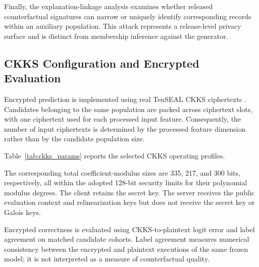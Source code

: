 \documentclass[preprint,12pt]{elsarticle}
\begin{document}
Finally, the explanation-linkage analysis examines whether released
counterfactual signatures can narrow or uniquely identify corresponding records
within an auxiliary population. This attack represents a release-level privacy
surface and is distinct from membership inference against the generator.

\subsection{CKKS Configuration and Encrypted Evaluation}
\label{subsec:he_config}

Encrypted prediction is implemented using real TenSEAL CKKS ciphertexts
\cite{benaissa2021tenseal}.
Candidates belonging to the same population are packed across ciphertext slots,
with one ciphertext used for each processed input feature. Consequently, the
number of input ciphertexts is determined by the processed feature dimension
rather than by the candidate population size.

Table~\ref{tab:ckks_params} reports the selected CKKS operating profiles.

\begin{table}[!ht]
\centering
\caption{Selected CKKS configurations for encrypted candidate evaluation.}
\label{tab:ckks_params}
\end{table}

The corresponding total coefficient-modulus sizes are 335, 217, and 300 bits,
respectively, all within the adopted 128-bit security limits for their
polynomial modulus degrees. The client retains the secret key. The server
receives the public evaluation context and relinearization keys but does not
receive the secret key or Galois keys.

Encrypted correctness is evaluated using CKKS-to-plaintext logit error and
label agreement on matched candidate cohorts. Label agreement measures
numerical consistency between the encrypted and plaintext executions of the
same frozen model; it is not interpreted as a measure of counterfactual
quality.
\end{document}
